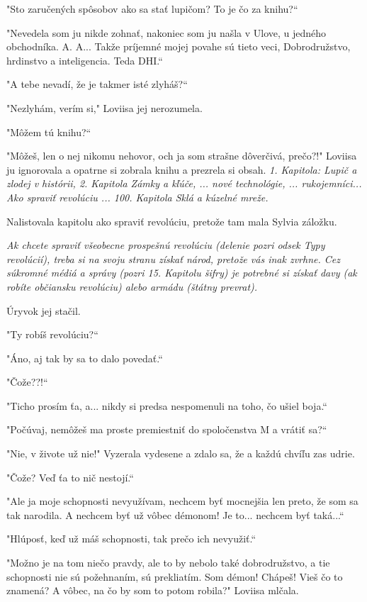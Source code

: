 \documentclass{book}
\begin{document}
"Sto zaručených spôsobov ako sa stať lupičom? To je čo za knihu?“

"Nevedela som ju nikde zohnať, nakoniec som ju našla v Ulove, u jedného obchodníka. A. A... Takže príjemné mojej povahe sú tieto veci, Dobrodružstvo, hrdinstvo a inteligencia. Teda DHI.“

"$ $A tebe nevadí, že je takmer isté zlyháš?“

"Nezlyhám, verím si,"$ $ Loviisa jej nerozumela.

"Môžem tú knihu?“

"Môžeš, len o nej nikomu nehovor, och ja som strašne dôverčivá, prečo?!"$ $ Loviisa ju ignorovala a opatrne si zobrala knihu a prezrela si obsah. \textit{1. Kapitola: Lupič a zlodej v histórii, 2. Kapitola Zámky a kľúče, ... nové technológie, ... rukojemníci... Ako spraviť revolúciu ... 100. Kapitola Sklá a kúzelné mreže.}

Nalistovala kapitolu ako spraviť revolúciu, pretože tam mala Sylvia záložku.

\textit{Ak chcete spraviť všeobecne prospešnú revolúciu (delenie pozri odsek Typy revolúcií), treba si na svoju stranu získať národ, pretože vás inak zvrhne. Cez súkromné médiá a správy (pozri 15. Kapitolu šifry) je potrebné si získať davy (ak robíte občiansku revolúciu) alebo armádu (štátny prevrat).}

Úryvok jej stačil.

"Ty robíš revolúciu?“

"Áno, aj tak by sa to dalo povedať.“

"Čože??!“

"Ticho prosím ťa, a... nikdy si predsa nespomenuli na toho, čo ušiel boja.“

"Počúvaj, nemôžeš ma proste premiestniť do spoločenstva M a vrátiť sa?“

"Nie, v živote už nie!"$ $ Vyzerala vydesene a zdalo sa, že a každú chvíľu zas udrie.

"Čože? Veď ťa to nič nestojí.“

"$ $Ale ja moje schopnosti nevyužívam, nechcem byť mocnejšia len preto, že som sa tak narodila. A nechcem byť už vôbec démonom! Je to... nechcem byť taká...“

"Hlúposť, keď už máš schopnosti, tak prečo ich nevyužiť.“

"Možno je na tom niečo pravdy, ale to by nebolo také dobrodružstvo, a tie schopnosti nie sú požehnaním, sú prekliatím. Som démon! Chápeš! Vieš čo to znamená? A vôbec, na čo by som to potom robila?"$ $ Loviisa mlčala.
\end{document}
